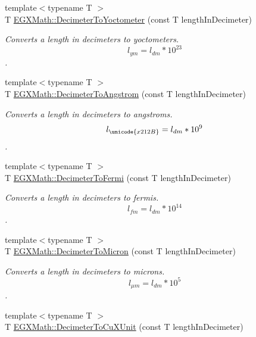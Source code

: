 \begin{DoxyCompactItemize}
{\footnotesize template$<$typename T $>$ }\\T \mbox{\hyperlink{group___e_g_x_math-_conversions-_length_conversions-_s_i-_decimeter-_s_i_ga9da3b12a8bfe244f7af0cc13cf0de4a8}{E\+G\+X\+Math\+::\+Decimeter\+To\+Yoctometer}} (const T length\+In\+Decimeter)
\begin{DoxyCompactList}\small\item\em Converts a length in decimeters to yoctometers. \[ l_{ym}=l_{dm} * 10^{23} \]. \end{DoxyCompactList}\item 
{\footnotesize template$<$typename T $>$ }\\T \mbox{\hyperlink{group___e_g_x_math-_conversions-_length_conversions-_s_i-_decimeter-_non-_s_i_gaffa5876e4f15bc859c369e8bfb9e4183}{E\+G\+X\+Math\+::\+Decimeter\+To\+Angstrom}} (const T length\+In\+Decimeter)
\begin{DoxyCompactList}\small\item\em Converts a length in decimeters to angstroms. \[ l_{\unicode{x212B}}=l_{dm} * 10^{9} \]. \end{DoxyCompactList}\item 
{\footnotesize template$<$typename T $>$ }\\T \mbox{\hyperlink{group___e_g_x_math-_conversions-_length_conversions-_s_i-_decimeter-_non-_s_i_ga2163b07afe9c89c1a1150516f615ef2a}{E\+G\+X\+Math\+::\+Decimeter\+To\+Fermi}} (const T length\+In\+Decimeter)
\begin{DoxyCompactList}\small\item\em Converts a length in decimeters to fermis. \[ l_{fm}=l_{dm} * 10^{14} \]. \end{DoxyCompactList}\item 
{\footnotesize template$<$typename T $>$ }\\T \mbox{\hyperlink{group___e_g_x_math-_conversions-_length_conversions-_s_i-_decimeter-_non-_s_i_gaebafc6e167156bb5158e5d335b25334b}{E\+G\+X\+Math\+::\+Decimeter\+To\+Micron}} (const T length\+In\+Decimeter)
\begin{DoxyCompactList}\small\item\em Converts a length in decimeters to microns. \[ l_{\mu m}=l_{dm} * 10^{5} \]. \end{DoxyCompactList}\item 
{\footnotesize template$<$typename T $>$ }\\T \mbox{\hyperlink{group___e_g_x_math-_conversions-_length_conversions-_s_i-_decimeter-_non-_s_i_gab595b2398e8e838922b4591308466e87}{E\+G\+X\+Math\+::\+Decimeter\+To\+Cu\+X\+Unit}} (const T length\+In\+Decimeter)

\end{DoxyCompactItemize}
